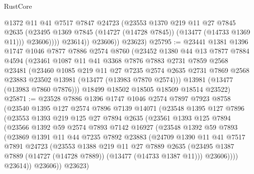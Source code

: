 \begin{lexlean}{RustCore}
\begin{coremodule}
                    @1372
                    @11
                    @41
                    @7517
                    @7847
                    @24723
                    (@23553
                      @1370
                      @219
                      @11
                      @27
                      @7845
                      @2635
                      (@23495 @1369 @7845 (@14727 (@14728 @7845)) (@13477 (@14733 @1369 @11)))
                      @23606))))
              @23614))
          @23606))
      @23623)
@25795 := @23441
    @1381
    @1396
    @1747
    @1046
    @7877
    @7886
    @2574
    @8760
    (@23452
      @1380
      @44
      @13
      @7877
      @7884
      @4594
      (@23461
        @1087
        @11
        @41
        @3368
        @7876
        @7883
        @2731
        @7859
        @2568
        @23481
        (@23460
          @1085
          @219
          @11
          @27
          @7235
          @2574
          @2635
          @2731
          @7869
          @2568
          @23883
          @23502
          @13981
          (@13477 (@13983 @7870 @2574)))
        @13981
        (@13477 (@13983 @7860 @7876)))
      @18499
      @18502
      @18505
      @18509
      @18514
      @23522)
@25871 := @23528
    @7886
    @1396
    @1747
    @1046
    @2574
    @7897
    @7923
    @8758
    (@23540
      @1395
      @127
      @2574
      @7896
      @7139
      @14071
      (@23548
        @1395
        @127
        @7896
        (@23553
          @1393
          @219
          @125
          @27
          @7894
          @2635
          (@23561
            @1393
            @125
            @7894
            (@23566
              @1392
              @59
              @2574
              @7893
              @7142
              @16927
              (@23548
                @1392
                @59
                @7893
                (@23869
                  @1391
                  @11
                  @44
                  @7235
                  @7892
                  @23883
                  (@24709
                    @1390
                    @11
                    @41
                    @7517
                    @7891
                    @24723
                    (@23553
                      @1388
                      @219
                      @11
                      @27
                      @7889
                      @2635
                      (@23495 @1387 @7889 (@14727 (@14728 @7889)) (@13477 (@14733 @1387 @11)))
                      @23606))))
              @23614))
          @23606))
      @23623)

\end{coremodule}
\end{lexlean}
